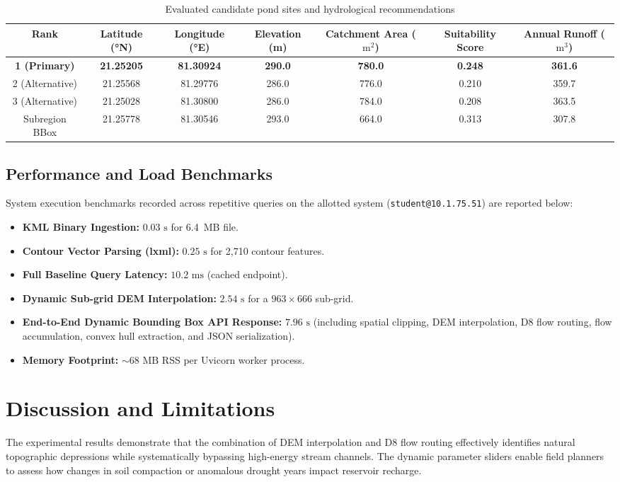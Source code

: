 \documentclass[manuscript,screen,review]{acmart}
\begin{document}
\begin{table}[h]
  \caption{Evaluated candidate pond sites and hydrological recommendations}
  \label{tab:results-candidates}
  \begin{tabular}{ccccccc}
    \toprule
    Rank & Latitude (°N) & Longitude (°E) & Elevation (m) & Catchment Area ($\text{m}^2$) & Suitability Score & Annual Runoff ($\text{m}^3$) \\
    \midrule
    \textbf{1 (Primary)} & \textbf{21.25205} & \textbf{81.30924} & \textbf{290.0} & \textbf{780.0} & \textbf{0.248} & \textbf{361.6} \\
    2 (Alternative) & 21.25568 & 81.29776 & 286.0 & 776.0 & 0.210 & 359.7 \\
    3 (Alternative) & 21.25028 & 81.30800 & 286.0 & 784.0 & 0.208 & 363.5 \\
    Subregion BBox & 21.25778 & 81.30546 & 293.0 & 664.0 & 0.313 & 307.8 \\
    \bottomrule
  \end{tabular}
\end{table}

\subsection{Performance and Load Benchmarks}
System execution benchmarks recorded across repetitive queries on the allotted system (\texttt{student@10.1.75.51}) are reported below:
\begin{itemize}
    \item \textbf{KML Binary Ingestion:} $0.03\text{ s}$ for 6.4~MB file.
    \item \textbf{Contour Vector Parsing (lxml):} $0.25\text{ s}$ for 2,710 contour features.
    \item \textbf{Full Baseline Query Latency:} $10.2\text{ ms}$ (cached endpoint).
    \item \textbf{Dynamic Sub-grid DEM Interpolation:} $2.54\text{ s}$ for a $963 \times 666$ sub-grid.
    \item \textbf{End-to-End Dynamic Bounding Box API Response:} $7.96\text{ s}$ (including spatial clipping, DEM interpolation, D8 flow routing, flow accumulation, convex hull extraction, and JSON serialization).
    \item \textbf{Memory Footprint:} $\sim 68\text{ MB}$ RSS per Uvicorn worker process.
\end{itemize}

\section{Discussion and Limitations}
\label{sec:discussion}
The experimental results demonstrate that the combination of DEM interpolation and D8 flow routing effectively identifies natural topographic depressions while systematically bypassing high-energy stream channels. The dynamic parameter sliders enable field planners to assess how changes in soil compaction or anomalous drought years impact reservoir recharge. 
\end{document}
